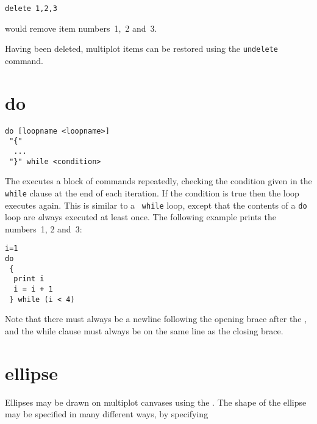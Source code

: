 \begin{verbatim}
delete 1,2,3
\end{verbatim}

\noindent would remove item numbers~1,~2 and~3.

Having been deleted, multiplot items can be restored using the {\tt undelete}
command.


\section{do}

\begin{verbatim}
do [loopname <loopname>]
 "{"
  ...
 "}" while <condition>
\end{verbatim}

The  executes a block of commands repeatedly, checking the
condition given in the {\tt while} clause at the end of each iteration.  If the
condition is true then the loop executes again. This is similar to a {\tt
while} loop, except that the contents of a {\tt do} loop are {\emph always}
executed at least once.  The following example prints the numbers~1, 2 and~3:

\begin{verbatim}
i=1
do
 {
  print i
  i = i + 1
 } while (i < 4)
\end{verbatim}

\noindent Note that there must always be a newline following the opening brace
after the , and the while clause must always be on the same line as
the closing brace.


\section{ellipse}

Ellipses may be drawn on multiplot canvases using the . The shape
of the ellipse may be specified in many different ways, by specifying

